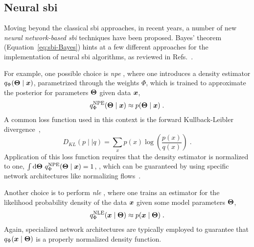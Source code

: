 \subsection{Neural \gls*{sbi}} \label{subsec:nsbi}

Moving beyond the classical \gls*{sbi} approaches, in recent years, a number of new \emph{neural network-based \gls*{sbi}} techniques have been proposed. Bayes' theorem (Equation~\eqref{eq:sbi-Bayes}) hints at a few different approaches for the implementation of neural \gls*{sbi} algorithms, as reviewed in Refs.~\cite{Cranmer:2019eaq, Lueckmann:2021aa}. 


For example, one possible choice is \emph{\gls*{npe}} \citep{Papamakarios:2016ctj, Greenberg:2019aa}, where one introduces a density estimator $q_\Phi(\bm{\Theta}\mid\bm{x})$, parametrized through the weights $\Phi$, which is trained to approximate the posterior for parameters $\bm{\Theta}$ given data $\bm{x}$,
\begin{equation}
    q^\text{NPE}_\Phi(\bm{\Theta} \mid \bm{x}) \approx p(\bm{\Theta}\mid\bm{x})\;.
\end{equation}
A common loss function used in this context is the forward Kullback-Leibler divergence~\cite{Kullback:1951zyt},
\begin{equation} \label{eq:kld}
    D_{KL}(p \mid\mid q) = \sum_{x} p(x) \log\left(\frac{p(x)}{q(x)}\right) \;.
\end{equation}
Application of this loss function requires that the density estimator is normalized to one, $\int \dd\param\ q^\text{NPE}_\Phi(\param \mid \data)=1$, , which can be guaranteed by using specific network architectures like normalizing flows~\cite{papamakarios2021normalizing}.

Another choice is to perform \emph{\gls*{nle}} \citep{Papamakarios:2018aa}, where one trains an estimator for the likelihood probability density of the data $\bm{x}$ given some model parameters $\bm{\Theta}$, 
\begin{equation}
    q^\text{NLE}_\Phi(\bm{x} \mid \bm{\Theta}) \approx p(\bm{x}\mid\bm{\Theta})\;.
\end{equation}
Again, specialized network architectures are typically employed to guarantee that $q_\Phi(\bm{x} \mid \bm{\Theta})$ is a properly normalized density function.

